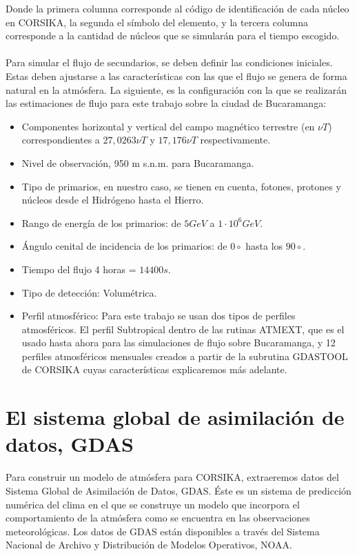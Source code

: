 Donde la primera columna corresponde al código de identificación de cada núcleo en CORSIKA, la segunda el símbolo del elemento, y la tercera columna corresponde a la cantidad de núcleos que se simularán para el tiempo escogido. \\
\\

Para simular el flujo de secundarios, se deben definir las condiciones iniciales. Estas deben ajustarse a las características con las que el flujo se genera de forma natural en la atmósfera. La siguiente, es la configuración con la que se realizarán las estimaciones de flujo  para este trabajo sobre la ciudad de Bucaramanga:\\
\newpage
\newpage

\begin{itemize}
    \item Componentes horizontal y vertical del campo magnético terrestre (en $\nu T$) correspondientes a $ 27,0263 \nu T$ y $17,176 \nu T$ respectivamente.
    \item Nivel de observación, 950 m s.n.m. para Bucaramanga.
    \item Tipo de primarios, en nuestro caso, se tienen en cuenta, fotones, protones y núcleos desde el Hidrógeno hasta el Hierro.
    \item Rango de energía de los primarios: de $5GeV$ a $1\cdot 10^{6} GeV$.
    \item Ángulo cenital de incidencia de los primarios: de $0\circ$ hasta los $90\circ$.
    \item Tiempo del flujo 4 horas = $14400 s$.
    \item Tipo de detección: Volumétrica.
    \item Perfil atmosférico: Para este trabajo se usan dos tipos de perfiles atmosféricos. El perfil Subtropical dentro de las rutinas ATMEXT, que es el usado hasta ahora para las simulaciones de flujo sobre Bucaramanga, y 12 perfiles atmosféricos mensuales creados a partir de la subrutina GDASTOOL de CORSIKA cuyas características explicaremos más adelante.
\end{itemize}{}

\section{El sistema global de asimilación de datos, GDAS}

Para construir un modelo de atmósfera para CORSIKA, extraeremos datos del Sistema Global de Asimilación de Datos, GDAS\cite{GDAS_data}. Éste es un sistema de predicción numérica del clima en el que se construye un modelo que incorpora el comportamiento de la atmósfera como se encuentra en las observaciones meteorológicas. Los datos de GDAS están disponibles a través del Sistema Nacional de Archivo y Distribución de Modelos Operativos, NOAA. \\

